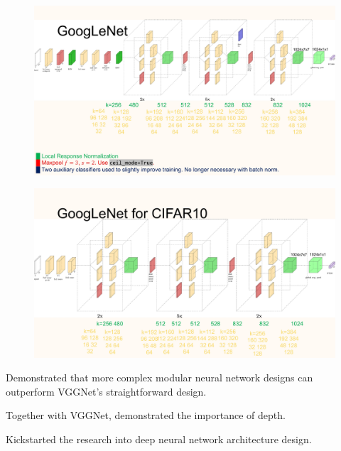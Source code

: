 \documentclass{report}
\begin{document}
\begin{definition}
    \begin{figure}[H]
        \centering
        \includegraphics[width=1.0\textwidth]{.././assets/7.13.jpg}
    \end{figure}
\end{definition}

\begin{definition}
    \begin{figure}[H]
        \centering
        \includegraphics[width=1.0\textwidth]{.././assets/7.14.jpg}
    \end{figure}
\end{definition}

\begin{concept}
    Demonstrated that more complex modular neural network designs can outperform VGGNet's straightforward design.

    Together with VGGNet, demonstrated the importance of depth.

    Kickstarted the research into deep neural network architecture design.
\end{concept}
\end{document}
